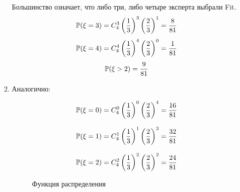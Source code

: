 \begin{enumerate}
\begin{enumerate}
Большинство означает, что либо три, либо четыре эксперта выбрали Fit.
\[
\P(\xi = 3) = C_4^3\left(\frac{1}{3}\right)^3 \left(\frac{2}{3}\right)^{1} = \frac{8}{81}
\]
\[
\P(\xi = 4) = C_4^4\left(\frac{1}{3}\right)^4 \left(\frac{2}{3}\right)^{0} = \frac{1}{81}
\]
\[
\P( \xi > 2) =  \frac{9}{81}
\]
\item Аналогично:

\[ \P(\xi = 0) = C_4^0\left(\frac{1}{3}\right)^0 \left(\frac{2}{3}\right)^{4} = \frac{16}{81}\]

\[ \P(\xi = 1) = C_4^1\left(\frac{1}{3}\right)^1 \left(\frac{2}{3}\right)^{3} = \frac{32}{81}\]

\[ \P(\xi = 2) = C_4^2\left(\frac{1}{3}\right)^2 \left(\frac{2}{3}\right)^{2} = \frac{24}{81}\]

\begin{figure}[h!]
    \noindent{}
    \caption{Функция распределения}
    \label{cdf_kr2017}
\end{figure}


\end{enumerate}
\end{enumerate}
